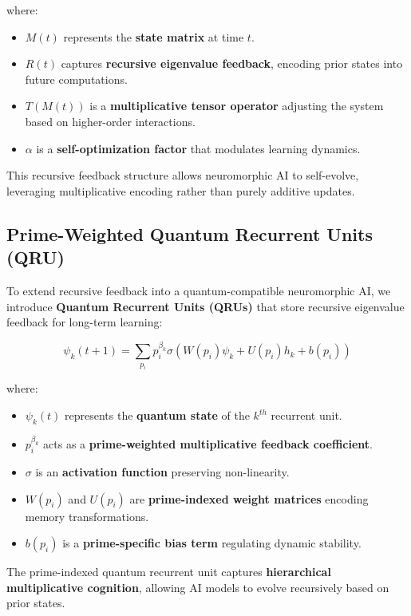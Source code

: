 \documentclass{article}
\theoremstyle{plain}
\theoremstyle{plain}
\theoremstyle{definition}
\theoremstyle{remark}
\begin{document}
where:
\begin{itemize}
    \item $M(t)$ represents the \textbf{state matrix} at time $t$.
    \item $R(t)$ captures \textbf{recursive eigenvalue feedback}, encoding prior states into future computations.
    \item $T(M(t))$ is a \textbf{multiplicative tensor operator} adjusting the system based on higher-order interactions.
    \item $\alpha$ is a \textbf{self-optimization factor} that modulates learning dynamics.
\end{itemize}

This recursive feedback structure allows neuromorphic AI to self-evolve, leveraging multiplicative encoding rather than purely additive updates.

\subsection{Prime-Weighted Quantum Recurrent Units (QRU)}

To extend recursive feedback into a quantum-compatible neuromorphic AI, we introduce \textbf{Quantum Recurrent Units (QRUs)} that store recursive eigenvalue feedback for long-term learning:

\begin{equation}
\psi_k (t+1) = \sum_{p_i} p_i^{\beta_k} \sigma (W(p_i) \psi_k + U(p_i) h_k + b(p_i))
\end{equation}

where:
\begin{itemize}
    \item $\psi_k (t)$ represents the \textbf{quantum state} of the $k^{th}$ recurrent unit.
    \item $p_i^{\beta_k}$ acts as a \textbf{prime-weighted multiplicative feedback coefficient}.
    \item $\sigma$ is an \textbf{activation function} preserving non-linearity.
    \item $W(p_i)$ and $U(p_i)$ are \textbf{prime-indexed weight matrices} encoding memory transformations.
    \item $b(p_i)$ is a \textbf{prime-specific bias term} regulating dynamic stability.
\end{itemize}

The prime-indexed quantum recurrent unit captures \textbf{hierarchical multiplicative cognition}, allowing AI models to evolve recursively based on prior states.
\end{document}
